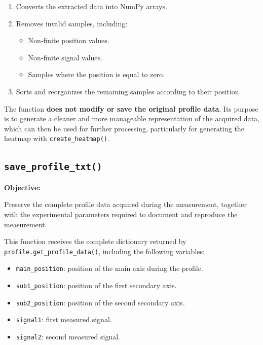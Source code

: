 \documentclass[../../main.tex]{subfiles}
\begin{document}
\begin{enumerate}
    \item Converts the extracted data into NumPy arrays.
    
    \item Removes invalid samples, including:
    \begin{itemize}
        \item Non-finite position values.
        \item Non-finite signal values.
        \item Samples where the position is equal to zero.
    \end{itemize}
    
    \item Sorts and reorganizes the remaining samples according to their
    position.
\end{enumerate}

The function \textbf{does not modify or save the original profile data}.
Its purpose is to generate a cleaner and more manageable representation of
the acquired data, which can then be used for further processing,
particularly for generating the heatmap with
\texttt{create\_heatmap()}.


\subsection{\texttt{save\_profile\_txt()}}

\textbf{Objective:}

Preserve the complete profile data acquired during the measurement, together
with the experimental parameters required to document and reproduce the
measurement.

This function receives the complete dictionary returned by
\texttt{profile.get\_profile\_data()}, including the following variables:

\begin{itemize}
    \item \texttt{main\_position}: position of the main axis during the
    profile.
    \item \texttt{sub1\_position}: position of the first secondary axis.
    \item \texttt{sub2\_position}: position of the second secondary axis.
    \item \texttt{signal1}: first measured signal.
    \item \texttt{signal2}: second measured signal.
\end{itemize}
\end{document}
